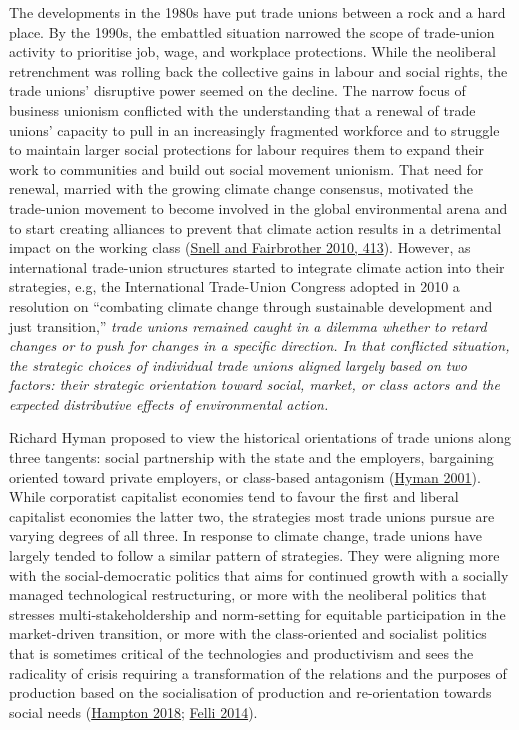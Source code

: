 \documentclass[a4paper, nobind]{templates/ociamthesis}
\begin{document}
The developments in the 1980s have put trade unions between a rock and a hard place. By the 1990s, the embattled situation narrowed the scope of trade-union activity to prioritise job, wage, and workplace protections. While the neoliberal retrenchment was rolling back the collective gains in labour and social rights, the trade unions' disruptive power seemed on the decline. The narrow focus of business unionism conflicted with the understanding that a renewal of trade unions' capacity to pull in an increasingly fragmented workforce and to struggle to maintain larger social protections for labour requires them to expand their work to communities and build out social movement unionism. That need for renewal, married with the growing climate change consensus, motivated the trade-union movement to become involved in the global environmental arena and to start creating alliances to prevent that climate action results in a detrimental impact on the working class (\protect\hyperlink{ref-snell_unions_2010}{Snell and Fairbrother 2010, 413}). However, as international trade-union structures started to integrate climate action into their strategies, e.g, the International Trade-Union Congress adopted in 2010 a resolution on ``combating climate change through sustainable development and just transition,'' \emph{trade unions remained caught in a dilemma whether to retard changes or to push for changes in a specific direction. In that conflicted situation, the strategic choices of individual trade unions aligned largely based on two factors: their strategic orientation toward social, market, or class actors and the expected distributive effects of environmental action.}

Richard Hyman proposed to view the historical orientations of trade unions along three tangents: social partnership with the state and the employers, bargaining oriented toward private employers, or class-based antagonism (\protect\hyperlink{ref-hyman_understanding_2001}{Hyman 2001}). While corporatist capitalist economies tend to favour the first and liberal capitalist economies the latter two, the strategies most trade unions pursue are varying degrees of all three. In response to climate change, trade unions have largely tended to follow a similar pattern of strategies. They were aligning more with the social-democratic politics that aims for continued growth with a socially managed technological restructuring, or more with the neoliberal politics that stresses multi-stakeholdership and norm-setting for equitable participation in the market-driven transition, or more with the class-oriented and socialist politics that is sometimes critical of the technologies and productivism and sees the radicality of crisis requiring a transformation of the relations and the purposes of production based on the socialisation of production and re-orientation towards social needs (\protect\hyperlink{ref-hampton_trade_2018}{Hampton 2018}; \protect\hyperlink{ref-felli_alternative_2014}{Felli 2014}).
\end{document}
